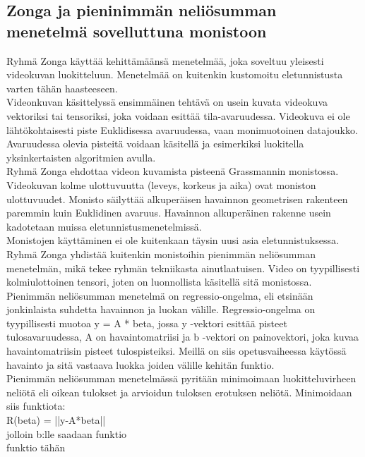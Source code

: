 \subsection{Zonga ja pieninimmän neliösumman menetelmä sovelluttuna monistoon}
Ryhmä Zonga käyttää kehittämäänsä menetelmää, joka soveltuu yleisesti videokuvan luokitteluun. 
Menetelmää on kuitenkin kustomoitu eletunnistusta varten tähän haasteeseen.\\

Videonkuvan käsittelyssä ensimmäinen tehtävä on usein kuvata videokuva vektoriksi tai tensoriksi, joka voidaan esittää tila-avaruudessa. 
Videokuva ei ole lähtökohtaisesti piste Euklidisessa avaruudessa, vaan monimuotoinen datajoukko. Avaruudessa olevia pisteitä voidaan käsitellä
ja esimerkiksi luokitella yksinkertaisten algoritmien avulla.\\

Ryhmä Zonga ehdottaa videon kuvamista pisteenä Grassmannin monistossa. Videokuvan kolme ulottuvuutta (leveys, korkeus ja aika) ovat moniston ulottuvuudet.
Monisto säilyttää alkuperäisen havainnon geometrisen rakenteen paremmin kuin Euklidinen avaruus.
Havainnon alkuperäinen rakenne usein kadotetaan muissa eletunnistusmenetelmissä. \\

Monistojen käyttäminen ei ole kuitenkaan täysin uusi asia eletunnistuksessa.
Ryhmä Zonga yhdistää kuitenkin monistoihin pienimmän neliösumman menetelmän, mikä tekee ryhmän tekniikasta ainutlaatuisen. 
Video on tyypillisesti kolmiulottoinen tensori, joten on luonnollista käsitellä sitä monistossa.
Pienimmän neliösumman menetelmä on regressio-ongelma, eli etsinään jonkinlaista suhdetta havainnon ja luokan välille.
Regressio-ongelma on tyypillisesti muotoa y = A * beta, jossa y -vektori esittää pisteet tulosavaruudessa, A on havaintomatriisi 
ja b -vektori on painovektori, joka kuvaa havaintomatriisin pisteet tulospisteiksi.
Meillä on siis opetusvaiheessa käytössä havainto ja sitä vastaava luokka joiden välille kehitän funktio.\\

Pienimmän neliösumman menetelmässä pyritään minimoimaan luokitteluvirheen neliötä eli oikean tulokset ja arvioidun tuloksen erotuksen neliötä.
Minimoidaan siis funktiota: \\
R(beta) = ||y-A*beta|| \\
jolloin b:lle saadaan funktio\\
funktio tähän\\

